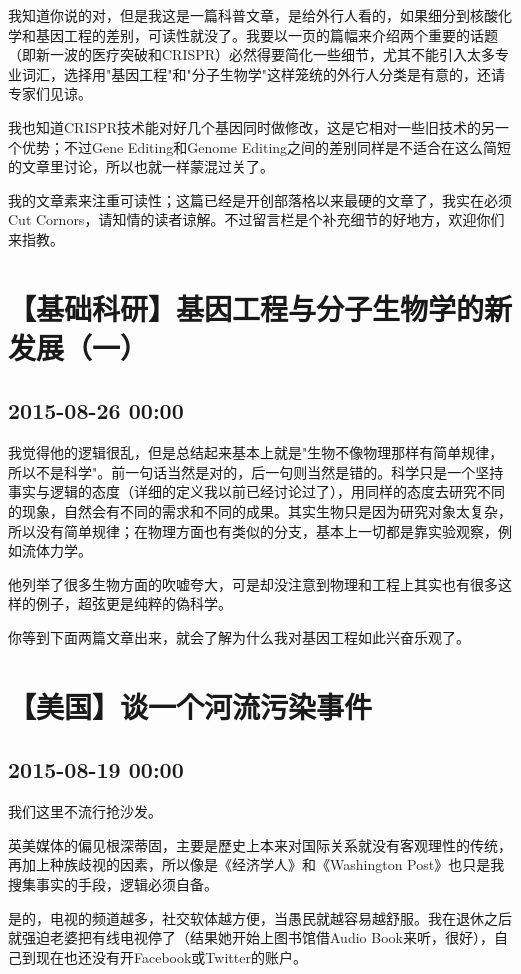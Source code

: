\documentclass[twocolumn]{ctexart}
\begin{document}
我知道你说的对，但是我这是一篇科普文章，是给外行人看的，如果细分到核酸化学和基因工程的差别，可读性就没了。我要以一页的篇幅来介绍两个重要的话题（即新一波的医疗突破和CRISPR）必然得要简化一些细节，尤其不能引入太多专业词汇，选择用"基因工程"和"分子生物学"这样笼统的外行人分类是有意的，还请专家们见谅。

我也知道CRISPR技术能对好几个基因同时做修改，这是它相对一些旧技术的另一个优势；不过Gene Editing和Genome Editing之间的差别同样是不适合在这么简短的文章里讨论，所以也就一样蒙混过关了。

我的文章素来注重可读性；这篇已经是开创部落格以来最硬的文章了，我实在必须Cut Cornors，请知情的读者谅解。不过留言栏是个补充细节的好地方，欢迎你们来指教。\section*{【基础科研】基因工程与分子生物学的新发展（一）}
\subsection*{2015-08-26 00:00}
我觉得他的逻辑很乱，但是总结起来基本上就是"生物不像物理那样有简单规律，所以不是科学"。前一句话当然是对的，后一句则当然是错的。科学只是一个坚持事实与逻辑的态度（详细的定义我以前已经讨论过了），用同样的态度去研究不同的现象，自然会有不同的需求和不同的成果。其实生物只是因为研究对象太复杂，所以没有简单规律；在物理方面也有类似的分支，基本上一切都是靠实验观察，例如流体力学。

他列举了很多生物方面的吹嘘夸大，可是却没注意到物理和工程上其实也有很多这样的例子，超弦更是纯粹的偽科学。

你等到下面两篇文章出来，就会了解为什么我对基因工程如此兴奋乐观了。\section*{【美国】谈一个河流污染事件}
\subsection*{2015-08-19 00:00}
我们这里不流行抢沙发。

英美媒体的偏见根深蒂固，主要是歷史上本来对国际关系就没有客观理性的传统，再加上种族歧视的因素，所以像是《经济学人》和《Washington Post》也只是我搜集事实的手段，逻辑必须自备。

是的，电视的频道越多，社交软体越方便，当愚民就越容易越舒服。我在退休之后就强迫老婆把有线电视停了（结果她开始上图书馆借Audio Book来听，很好），自己到现在也还没有开Facebook或Twitter的账户。
\end{document}
